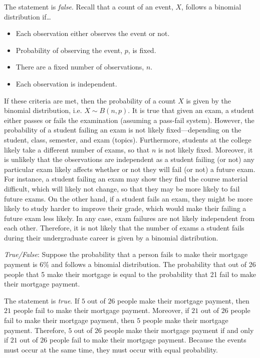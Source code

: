 \documentclass[11pt,letterpaper]{article}
\begin{document}
\sol The statement is \textit{false}. Recall that a count of an event, $X$, follows a binomial distribution if\dots
	\begin{itemize}
	\item Each observation either observes the event or not.
	\item Probability of observing the event, $p$, is fixed. 
	\item There are a fixed number of observations, $n$.
	\item Each observation is independent. 
	\end{itemize}
If these criteria are met, then the probability of a count $X$ is given by the binomial distribution, i.e. $X \sim B(n, p)$. It is true that given an exam, a student either passes or fails the examination (assuming a pass-fail system). However, the probability of a student failing an exam is not likely fixed---depending on the student, class, semester, and exam (topics). Furthermore, students at the college likely take a different number of exams, so that $n$ is not likely fixed. Moreover, it is unlikely that the observations are independent as a student failing (or not) any particular exam likely affects whether or not they will fail (or not) a future exam. For instance, a student failing an exam may show they find the course material difficult, which will likely not change, so that they may be more likely to fail future exams. On the other hand, if a student fails an exam, they might be more likely to study harder to improve their grade, which would make their failing a future exam less likely. In any case, exam failures are not likely independent from each other. Therefore, it is not likely that the number of exams a student fails during their undergraduate career is given by a binomial distribution. \pvspace{1.3cm}



\quizsol \textit{True/False}: Suppose the probability that a person fails to make their mortgage payment is 6\% and follows a binomial distribution. The probability that out of 26 people that 5 make their mortgage is equal to the probability that 21 fail to make their mortgage payment. \pspace

\sol The statement is \textit{true}. If $5$ out of $26$ people make their mortgage payment, then $21$ people fail to make their mortgage payment. Moreover, if $21$ out of $26$ people fail to make their mortgage payment, then $5$ people make their mortgage payment. Therefore, $5$ out of $26$ people make their mortgage payment if and only if $21$ out of $26$ people fail to make their mortgage payment. Because the events must occur at the same time, they must occur with equal probability. \pvspace{1.3cm}
\end{document}
